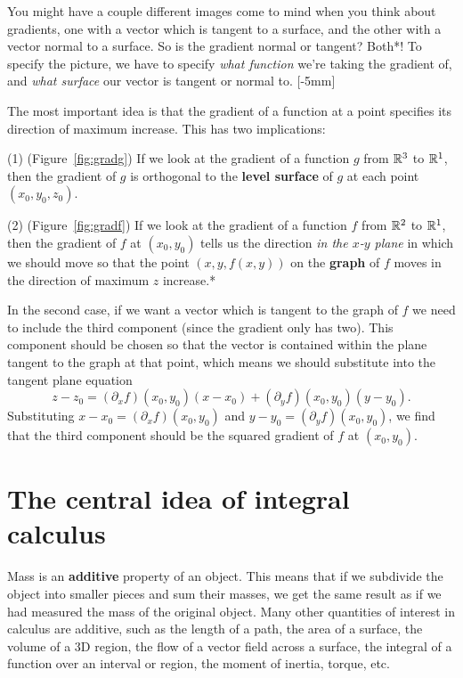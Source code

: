 \documentclass[svgnames]{watsonbook}
\begin{document}
You might have a couple different images come to
mind when you think about gradients, one with a vector which is
tangent to a surface, and the other with a vector normal to a
surface. So is the gradient normal or tangent? Both*! To specify the
picture, we have to specify \textit{what function} we're
taking the gradient of, and \textit{what surface} our vector is tangent or
normal to. 
[-5mm]

The most important idea is that the gradient of a function at a point
specifies its direction of maximum increase. This has two
implications:

(1) (Figure~\ref{fig:gradg}) If we look at the gradient of a function
$g$ from $\mathbb{R}^3$ to $\mathbb{R}^1$, then the gradient of $g$ is orthogonal to
the \textbf{level surface} of $g$ at each point $(x_0,y_0,z_0)$.

(2) (Figure~\ref{fig:gradf}) If we look at the gradient of a function
$f$ from $\mathbb{R}^2$ to $\mathbb{R}^1$, then the gradient of $f$ at $(x_0,y_0)$
tells us the direction \textit{in the $x$-$y$ plane} in which we
should move so that the point $(x,y,f(x,y))$ on the \textbf{graph} of
$f$ moves in the direction of maximum $z$ increase.* 

In the second case, if we want a vector which is tangent to the graph
of $f$ we need to include the third component (since the gradient only
has two). This component should be chosen so that the vector is
contained within the plane tangent to the graph at that point, which
means we should substitute into the tangent plane equation
\[
  z - z_0 = (\partial_x f)(x_0,y_0)(x-x_0) +  (\partial_y
  f)(x_0,y_0)(y-y_0). 
\]
Substituting $x-x_0 = (\partial_x f)(x_0,y_0)$ and $y-y_0 =
(\partial_y f)(x_0,y_0)$, we find that the third component should be
the squared gradient of $f$ at $(x_0,y_0)$. 



\newpage 

\section{The central idea of integral calculus} \label{sec:centralidea}

Mass is an \textbf{additive} property of an object. This means that if
we subdivide the object into smaller pieces and sum their masses, we
get the same result as if we had measured the mass of the original
object. Many other quantities of interest in calculus are additive,
such as the length of a path, the area of a surface, the volume of a
3D region, the flow of a vector field across a surface, the integral
of a function over an interval or region, the moment of inertia,
torque, etc.
\end{document}
